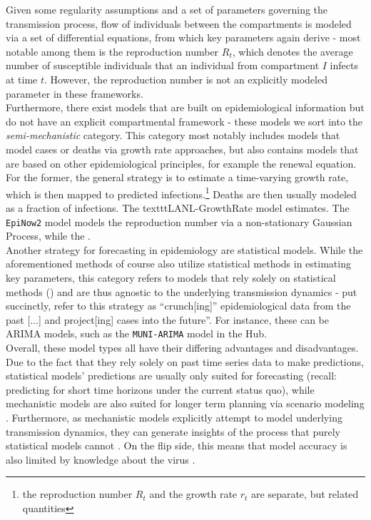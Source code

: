 Given some regularity assumptions and a set of parameters governing the transmission process, flow of individuals between the compartments is modeled via a set of differential equations, from which key parameters again derive - most notable among them is the reproduction number $R_t$, which denotes the average number of susceptible individuals that an individual from compartment $I$ infects at time $t$. However, the reproduction number is not an explicitly modeled parameter in these frameworks.\\
Furthermore, there exist models that are built on epidemiological information but do not have an explicit compartmental framework - these models we sort into the \textit{semi-mechanistic} category. This category most notably includes models that model cases or deaths via growth rate approaches, but also contains models that are based on other epidemiological principles, for example the renewal equation. For the former, the general strategy is to estimate a time-varying growth rate, which is then mapped to predicted infections.\footnote{the reproduction number $R_t$ and the growth rate $r_t$ are separate, but related quantities} Deaths are then usually modeled as a fraction of infections. The texttt{LANL-GrowthRate} model estimates. The \texttt{EpiNow2} model models the reproduction number via a non-stationary Gaussian Process,  while the . \\
Another strategy for forecasting in epidemiology are statistical models. While the aforementioned methods of course also utilize statistical methods in estimating key parameters, this category refers to models that rely solely on statistical methods () and are thus agnostic to the underlying transmission dynamics - put succinctly, \cite{holmdahl_wrong_2020} refer to this strategy as ``crunch[ing]'' epidemiological data from the past [...] and project[ing] cases into the future''. For instance, these can be ARIMA models, such as the \texttt{MUNI-ARIMA} model in the Hub.\\
Overall, these model types all have their differing advantages and disadvantages. Due to the fact that they rely solely on past time series data to make predictions, statistical models' predictions are usually only suited for forecasting (recall: predicting for short time horizons under the current status quo), while mechanistic models are also suited for longer term planning via scenario modeling \cite{reich_collaborative_2022}. Furthermore, as mechanistic models explicitly attempt to model underlying transmission dynamics, they can generate insights of the process that purely statistical models cannot \cite{james_use_2021} . On the flip side, this means that model accuracy is also limited by knowledge about the virus \cite{holmdahl_wrong_2020}.
